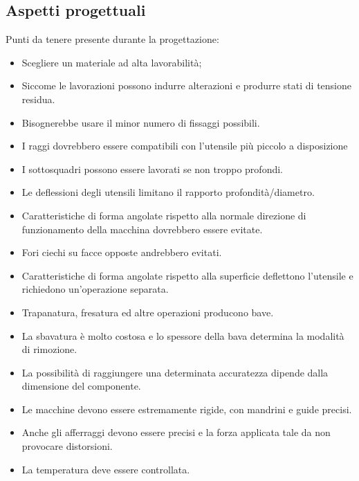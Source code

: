 \subsection{Aspetti progettuali}
Punti da tenere presente durante la progettazione:
\begin{itemize}
\item Scegliere un materiale ad alta lavorabilità;
\item Siccome le lavorazioni possono indurre alterazioni e produrre stati di tensione residua.
\item Bisognerebbe usare il minor numero di fissaggi possibili.
\item I raggi dovrebbero essere compatibili con l'utensile più piccolo a disposizione
\item I sottosquadri possono essere lavorati se non troppo profondi.
\item Le deflessioni degli utensili limitano il rapporto profondità/diametro.
\item Caratteristiche di forma angolate rispetto alla normale direzione di funzionamento della macchina dovrebbero essere evitate.
\item Fori ciechi su facce opposte andrebbero evitati.
\item Caratteristiche di forma angolate rispetto alla superficie deflettono l'utensile e richiedono un'operazione separata.
\item Trapanatura, fresatura ed altre operazioni producono bave.
\item La sbavatura è molto costosa e lo spessore della bava determina la modalità di rimozione.
\item La possibilità di raggiungere una determinata accuratezza dipende dalla dimensione del componente.
\item Le macchine devono essere estremamente rigide, con mandrini e guide precisi.
\item Anche gli afferraggi devono essere precisi e la forza applicata tale da non provocare distorsioni.
\item La temperatura deve essere controllata. 
\end{itemize}